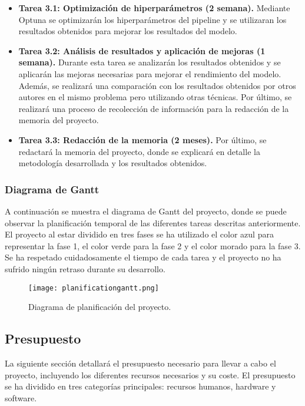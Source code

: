 \begin{itemize}
    \item \textbf{Tarea 3.1: Optimización de hiperparámetros (2 semana).} Mediante Optuna se optimizarán los
    hiperparámetros del pipeline y se utilizaran los resultados obtenidos para mejorar los resultados del
    modelo. 
    \item \textbf{Tarea 3.2: Análisis de resultados y aplicación de mejoras (1 semana).} Durante esta tarea se
    analizarán los resultados obtenidos y se aplicarán las mejoras necesarias para mejorar el rendimiento del
    modelo. Además, se realizará una comparación con los resultados obtenidos por otros autores en el mismo
    problema pero utilizando otras técnicas. Por último, se realizará una proceso de recolección de información
    para la redacción de la memoria del proyecto. 
    \item \textbf{Tarea 3.3: Redacción de la memoria (2 meses).} Por último, se redactará la memoria del proyecto,
    donde se explicará en detalle la metodología desarrollada y los resultados obtenidos.
\end{itemize}

\subsubsection{Diagrama de Gantt}
A continuación se muestra el diagrama de Gantt del proyecto, donde se puede observar la planificación
temporal de las diferentes tareas descritas anteriormente. El proyecto al estar dividido en tres fases
se ha utilizado el color azul para representar la fase 1, el color verde para la fase 2 y el color morado
para la fase 3. Se ha respetado cuidadosamente el tiempo de cada tarea y el proyecto no ha sufrido ningún
retraso durante su desarrollo.

\begin{figure}
    \centering
    \texttt{[image: planificationgantt.png]}
    \caption{Diagrama de planificación del proyecto.}
    \label{fig:gantt-planification}
\end{figure}

\subsection{Presupuesto}
La siguiente sección detallará el presupuesto necesario para llevar a cabo el proyecto,
incluyendo los diferentes recursos necesarios y su coste. El presupuesto se ha dividido
en tres categorías principales: recursos humanos, hardware y software.

